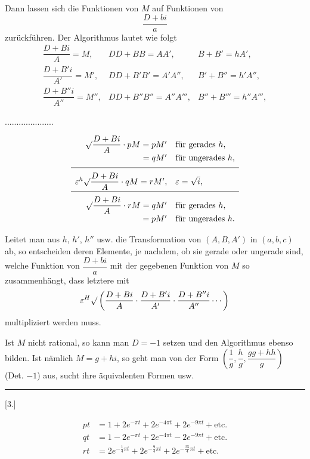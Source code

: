 Dann lassen sich die Funktionen von $M$ auf Funktionen von
\[
\frac{D+bi}{a}
\]
zurückführen. Der Algorithmus lautet wie folgt
\[
\begin{array}{ccc}
\dfrac{D+Bi}{A}=M,&DD+BB=AA',&B+B'=hA',\\[4pt]
\dfrac{D+B'i}{A'}=M',&DD+B'B'=A'A'',&B'+B''=h'A'',\\[4pt]
\dfrac{D+B''i}{A''}=M'',&DD+B''B''=A''A''',&B''+B'''=h''A''',
\end{array}
\]
\begin{center}.\quad .\quad .\quad .\quad .\quad .\quad .\quad .\quad .\quad .\quad .\quad .\quad .\quad .\quad .\quad .\quad .\quad .\quad .\quad .\quad .\end{center}
\[
\begin{array}{rl}
\mathord{\surd}\dfrac{D+Bi}{A}\cdot pM=pM'&\text{für gerades }h,\\[4pt]
{}=qM'&\text{für ungerades }h,\\[5pt]\hline\\[-6pt]
\varepsilon^h\mathord{\surd}\dfrac{D+Bi}{A}\cdot qM=rM',&\varepsilon=\sqrt{i},\\[5pt]\hline\\[-6pt]
\mathord{\surd}\dfrac{D+Bi}{A}\cdot rM=qM'&\text{für gerades }h,\\[4pt]
{}=pM'&\text{für ungerades }h.
\end{array}
\]

Leitet man aus $h$, $h'$, $h''$ usw. die Transformation von $(A,B,A')$ in $(a,b,c)$ ab, so entscheiden deren Elemente, je nachdem, ob sie gerade oder ungerade sind, welche Funktion von $\dfrac{D+bi}{a}$ mit der gegebenen Funktion von $M$ so zusammenhängt, dass letztere mit
\[
\varepsilon^H\mathord{\surd}\left(\dfrac{D+Bi}{A}\cdot\dfrac{D+B'i}{A'}\cdot\dfrac{D+B''i}{A''}\cdots\right)
\]
multipliziert werden muss.

Ist $M$ nicht rational, so kann man $D=-1$ setzen und den Algorithmus ebenso bilden. Ist nämlich $M=g+hi$, so geht man von der Form $\left(\dfrac1g,\dfrac hg,\dfrac{gg+hh}{g}\right)$ (Det. $-1$) aus, sucht ihre äquivalenten Formen usw.

\begin{center}\rule{3cm}{.4pt}\end{center}
\begin{center}[3.]\end{center}
\[
\begin{aligned}
pt&=1+2e^{-\pi t}+2e^{-4\pi t}+2e^{-9\pi t}+\text{etc.}\\
qt&=1-2e^{-\pi t}+2e^{-4\pi t}-2e^{-9\pi t}+\text{etc.}\\
rt&=2e^{-\frac14\pi t}+2e^{-\frac94\pi t}+2e^{-\frac{25}4\pi t}+\text{etc.}
\end{aligned}
\]

